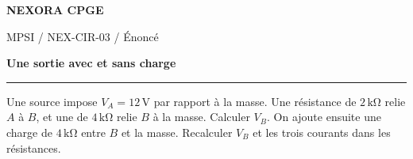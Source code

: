 \documentclass[11pt,a4paper]{article}
\begin{document}
{\small\bfseries\color{nexorablue} NEXORA CPGE}\par
{\small MPSI / NEX-CIR-03 / Énoncé}\par
{\LARGE\bfseries Une sortie avec et sans charge}\par
\vspace{0.25em}\hrule\vspace{0.6em}

Une source impose $V_A=12\,\mathrm V$ par rapport à la masse. Une résistance de $2\,\mathrm{k\Omega}$ relie $A$ à $B$, et une de $4\,\mathrm{k\Omega}$ relie $B$ à la masse. Calculer $V_B$. On ajoute ensuite une charge de $4\,\mathrm{k\Omega}$ entre $B$ et la masse. Recalculer $V_B$ et les trois courants dans les résistances.
\end{document}
